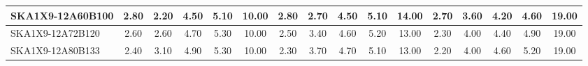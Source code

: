 \begin{table}[H]
{{\begin{tabular}{|lccccc||ccccc||ccccc|}
SKA1X9-12A60B100 & 2.80 \cellcolor{blue!46.00} & 2.20 \cellcolor{red!18.00} & 4.50 \cellcolor{green!26.40} & 5.10 \cellcolor{orange!43.20} & 10.00 \cellcolor{purple!60.00} & 2.80 \cellcolor{blue!48.00} & 2.70 \cellcolor{red!29.20} & 4.50 \cellcolor{green!39.00} & 5.10 \cellcolor{orange!51.60} & 14.00 \cellcolor{purple!60.00} & 2.70 \cellcolor{blue!44.25} & 3.60 \cellcolor{red!36.00} & 4.20 \cellcolor{green!32.00} & 4.60 \cellcolor{orange!32.00} & 19.00 \cellcolor{purple!60.00}\\ \hline 
SKA1X9-12A72B120 & 2.60 \cellcolor{blue!32.00} & 2.60 \cellcolor{red!30.00} & 4.70 \cellcolor{green!43.20} & 5.30 \cellcolor{orange!60.00} & 10.00 \cellcolor{purple!60.00} & 2.50 \cellcolor{blue!30.00} & 3.40 \cellcolor{red!48.80} & 4.60 \cellcolor{green!49.50} & 5.20 \cellcolor{orange!60.00} & 13.00 \cellcolor{purple!18.00} & 2.30 \cellcolor{blue!23.25} & 4.00 \cellcolor{red!60.00} & 4.40 \cellcolor{green!46.00} & 4.90 \cellcolor{orange!46.00} & 19.00 \cellcolor{purple!60.00}\\ \hline 
SKA1X9-12A80B133 & 2.40 \cellcolor{blue!18.00} & 3.10 \cellcolor{red!45.00} & 4.90 \cellcolor{green!60.00} & 5.30 \cellcolor{orange!60.00} & 10.00 \cellcolor{purple!60.00} & 2.30 \cellcolor{blue!18.00} & 3.70 \cellcolor{red!57.20} & 4.70 \cellcolor{green!60.00} & 5.10 \cellcolor{orange!51.60} & 13.00 \cellcolor{purple!18.00} & 2.20 \cellcolor{blue!18.00} & 4.00 \cellcolor{red!60.00} & 4.60 \cellcolor{green!60.00} & 5.20 \cellcolor{orange!60.00} & 19.00 \cellcolor{purple!60.00}\\ \hline 
\end{tabular}}
\vspace{-0.300000cm}
\hspace{1cm} 
}
\end{table}
